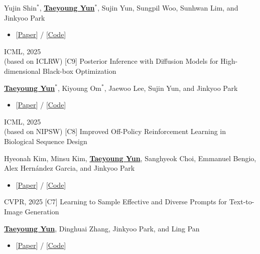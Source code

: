 \documentclass[10pt]{developercv} %
\begin{document}
\begin{entrylist}
        {}
        {Yujin Shin$^{*}$, \underline{\textbf{Taeyoung Yun$^{*}$}}, Sujin Yun, Sungpil Woo, Sunhwan Lim, and Jinkyoo Park
        \begin{itemize}[noitemsep,topsep=2pt,parsep=2pt,partopsep=0pt, leftmargin=0pt]
            \item[]{[\href{https://dl.acm.org/doi/10.1145/3711896.3737181}{Paper}] / [\href{https://github.com/dbsxodud-11/layopt}{Code}]}
        \end{itemize}
        }
    \vspace{-3pt}
    \entry
        {ICML, 2025 \\ (based on ICLRW)}
        {[C9] Posterior Inference with Diffusion Models for High-dimensional Black-box Optimization}
        {}
        {\underline{\textbf{Taeyoung Yun$^{*}$}}, Kiyoung Om$^*$, Jaewoo Lee, Sujin Yun, and Jinkyoo Park
        \begin{itemize}[noitemsep,topsep=2pt,parsep=2pt,partopsep=0pt, leftmargin=0pt]
            \item[]{[\href{https://arxiv.org/abs/2502.16824}{Paper}] / [\href{https://github.com/umkiyoung/DiBO}{Code}]}
        \end{itemize}
        }
    \vspace{-3pt}
    \entry
        {ICML, 2025 \\(based on NIPSW)}
        {[C8] Improved Off-Policy Reinforcement Learning in Biological Sequence Design}
        {}
        {Hyeonah Kim, Minsu Kim, \underline{\textbf{Taeyoung Yun}}, Sanghyeok Choi, Emmanuel Bengio, Alex Hern\'andez Garcia, and Jinkyoo Park
        \begin{itemize}[noitemsep,topsep=2pt,parsep=2pt,partopsep=0pt, leftmargin=0pt]
            \item[]{[\href{https://arxiv.org/abs/2410.04461}{Paper}] / [\href{https://github.com/hyeonahkimm/delta_cs}{Code}]}
        \end{itemize}
        }
    \vspace{-3pt}
    \entry
        {CVPR, 2025}
        {[C7] Learning to Sample Effective and Diverse Prompts for Text-to-Image Generation}
        {}
        {\underline{\textbf{Taeyoung Yun}}, Dinghuai Zhang, Jinkyoo Park, and Ling Pan
        \begin{itemize}[noitemsep,topsep=2pt,parsep=2pt,partopsep=0pt, leftmargin=0pt]
            \item[]{[\href{https://openaccess.thecvf.com/content/CVPR2025/html/Yun_Learning_to_Sample_Effective_and_Diverse_Prompts_for_Text-to-Image_Generation_CVPR_2025_paper.html}{Paper}] / [\href{https://github.com/dbsxodud-11/PAG}{Code}]}

\end{itemize}}
\end{entrylist}
\end{document}
